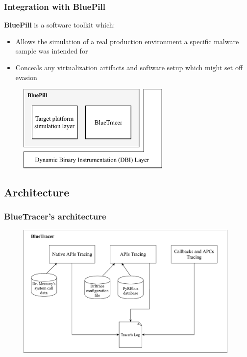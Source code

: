 \documentclass[compress]{beamer}
\begin{document}
\begin{frame}
    \frametitle{Integration with BluePill}
	\textbf{BluePill} is a software toolkit which:
	\begin{itemize}
	\item Allows the simulation of a real production environment a specific malware
sample was intended for
	\item Conceals any virtualization artifacts and software setup which might set off
evasion
	\end{itemize}
	\medskip
	
	    \begin{figure}
    	\vspace{-0.3cm}
        \includegraphics[width=7.5cm]{image/BluePill.pdf}
    \end{figure}

\end{frame}

\subsection{Architecture}

\begin{frame}
    \frametitle{BlueTracer's architecture}
    
    \begin{figure}
    	\vspace{-0.5cm}
        \includegraphics[width=11cm]{image/BlueTracer.pdf}
    \end{figure}
    
	

\end{frame}
\end{document}
